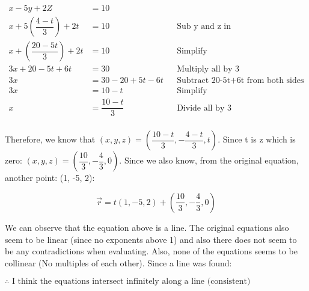 \documentclass[12pt]{book}
\begin{document}
\begin{enumerate}
\addtolength{\jot}{-0.2em}
\begin{align*}
  x-5y+2Z &=10 \\
  x+5 \left( \dfrac{4-t}{3} \right)+2t &=10 && \text{Sub y and z in} \\
  x+\left( \dfrac{20-5t}{3} \right)+2t &=10 && \text{Simplify} \\
  3x+20-5t+6t &=30 && \text{Multiply all by 3} \\
  3x &=30-20+5t-6t && \text{Subtract 20-5t+6t from both sides} \\
  3x &=10-t && \text{Simplify} \\
  x &= \dfrac{10-t}{3} && \text{Divide all by 3} \\
\end{align*}

Therefore, we know that $(x, y, z) = \left(\dfrac{10-t}{3}, -\dfrac{4-t}{3}, t \right)$. Since t is z which is zero:
$(x, y, z) = \left(\dfrac{10}{3}, -\dfrac{4}{3}, 0 \right)$. Since we also know, from the original equation, another point: (1, -5, 2):

$$\vec{r} = t(1, -5, 2) + \left(\dfrac{10}{3}, -\dfrac{4}{3}, 0 \right)$$

\newpage

\vspace{0.3cm}
We can observe that the equation above is a line. The original equations also 
seem to be linear (since no exponents above 1) 
and also there does not seem to be any contradictions when evaluating. Also, none of the 
equations seems to be collinear (No multiples of each other). Since a line was found:

\vspace{0.3cm}
\begin{center}
  $\boxed{\therefore \text{ I think the equations intersect infinitely along a line (consistent)}}$
\end{center}

\newpage



\end{enumerate}
\end{document}
